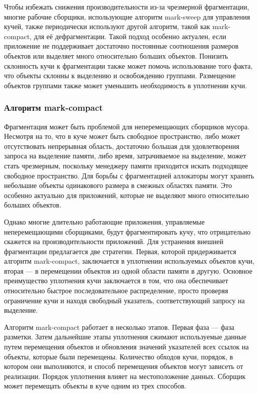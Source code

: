 Чтобы избежать снижения производительности из-за чрезмерной фрагментации, многие рабочие сборщики, использующие алгоритм mark-sweep для управления кучей, также периодически используют другой алгоритм, такой как mark-compact, для её дефрагментации. Такой подход особенно актуален, если приложение не поддерживает достаточно постоянные соотношения размеров объектов или выделяет много относительно больших объектов. Понизить склонность кучи к фрагментации также может помочь использование того факта, что объекты склонны к выделению и освобождению группами. Размещение объектов группами также может уменьшить необходимость в уплотнении кучи. \cite{handbook}



\subsubsection{Алгоритм mark-compact}

Фрагментация может быть проблемой для неперемещающих сборщиков мусора. Несмотря на то, что в куче может быть свободное пространство, либо может отсутствовать непрерывная область, достаточно большая для удовлетворения запроса на выделение памяти, либо время, затрачиваемое на выделение, может стать чрезмерным, поскольку менеджеру памяти приходится искать подходящее свободное пространство. Для борьбы с фрагментацией аллокаторы могут хранить небольшие объекты одинакового размера в смежных областях памяти. Это особенно актуально для приложений, которые не выделяют много относительно больших объектов.  \cite{handbook}

Однако многие длительно работающие приложения, управляемые неперемещающими сборщиками, будут фрагментировать кучу, что отрицательно скажется на производительности приложений. Для устранения внешней фрагментации предлагается две стратегии. Первая, которой придерживается алгоритм mark-compact, заключается в уплотнении используемых объектов кучи, вторая --- в перемещении объектов из одной области памяти в другую. Основное преимущество уплотнения кучи заключается в том, что она обеспечивает относительно быстрое последовательное распределение, просто проверяя ограничение кучи и находя свободный указатель, соответствующий запросу на выделение. \cite{handbook}

Алгоритм mark-compact работает в несколько этапов. Первая фаза --- фаза разметки. Затем дальнейшие
этапы уплотнения сжимают используемые данные путем перемещения объектов и обновления значений указателей всех ссылок на объекты, которые были перемещены. Количество обходов кучи, порядок, в котором они выполняются, и способ перемещения объектов могут зависеть от реализации. Порядок уплотнения влияет на местоположение данных. Сборщик может перемещать объекты в куче одним из трех способов. \cite{handbook}

